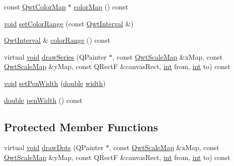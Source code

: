 \begin{DoxyCompactItemize}
\item 
const \hyperlink{class_qwt_color_map}{Qwt\-Color\-Map} $\ast$ \hyperlink{class_qwt_plot_spectro_curve_a901a8ee5d6aa7b6e41eadf8f1bdc1e03}{color\-Map} () const 
\item 
\hyperlink{group___u_a_v_objects_plugin_ga444cf2ff3f0ecbe028adce838d373f5c}{void} \hyperlink{class_qwt_plot_spectro_curve_a133f4117e925a1faed456bd9524477e4}{set\-Color\-Range} (const \hyperlink{class_qwt_interval}{Qwt\-Interval} \&)
\item 
\hyperlink{class_qwt_interval}{Qwt\-Interval} \& \hyperlink{class_qwt_plot_spectro_curve_aa495f44361e659e5fd83882e21e56542}{color\-Range} () const 
\item 
virtual \hyperlink{group___u_a_v_objects_plugin_ga444cf2ff3f0ecbe028adce838d373f5c}{void} \hyperlink{class_qwt_plot_spectro_curve_a04529b82d2acbcf9fc8f66da73bae8e9}{draw\-Series} (Q\-Painter $\ast$, const \hyperlink{class_qwt_scale_map}{Qwt\-Scale\-Map} \&x\-Map, const \hyperlink{class_qwt_scale_map}{Qwt\-Scale\-Map} \&y\-Map, const Q\-Rect\-F \&canvas\-Rect, \hyperlink{ioapi_8h_a787fa3cf048117ba7123753c1e74fcd6}{int} from, \hyperlink{ioapi_8h_a787fa3cf048117ba7123753c1e74fcd6}{int} to) const 
\item 
\hyperlink{group___u_a_v_objects_plugin_ga444cf2ff3f0ecbe028adce838d373f5c}{void} \hyperlink{class_qwt_plot_spectro_curve_ac3246da1a881538149addc2f22401578}{set\-Pen\-Width} (\hyperlink{_super_l_u_support_8h_a8956b2b9f49bf918deed98379d159ca7}{double} \hyperlink{glext_8h_a76aaa5c50746272e7d2de9aece921757}{width})
\item 
\hyperlink{_super_l_u_support_8h_a8956b2b9f49bf918deed98379d159ca7}{double} \hyperlink{class_qwt_plot_spectro_curve_a81a531d89ac21d25e86a958822720f38}{pen\-Width} () const 
\end{DoxyCompactItemize}
\subsection*{Protected Member Functions}
\begin{DoxyCompactItemize}
\item 
virtual \hyperlink{group___u_a_v_objects_plugin_ga444cf2ff3f0ecbe028adce838d373f5c}{void} \hyperlink{class_qwt_plot_spectro_curve_af6f48a0334d5646e2def2b3bfd16754c}{draw\-Dots} (Q\-Painter $\ast$, const \hyperlink{class_qwt_scale_map}{Qwt\-Scale\-Map} \&x\-Map, const \hyperlink{class_qwt_scale_map}{Qwt\-Scale\-Map} \&y\-Map, const Q\-Rect\-F \&canvas\-Rect, \hyperlink{ioapi_8h_a787fa3cf048117ba7123753c1e74fcd6}{int} from, \hyperlink{ioapi_8h_a787fa3cf048117ba7123753c1e74fcd6}{int} to) const 
\end{DoxyCompactItemize}
